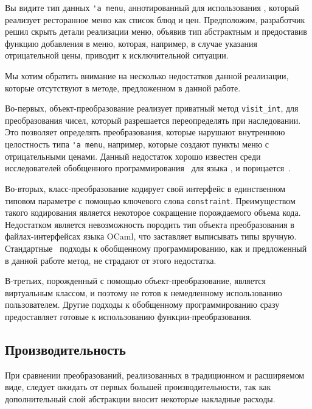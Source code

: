 \noindent Вы видите тип данных \lstinline{'a menu}, аннотированный для использования \visitors{}, который реализует ресторанное меню как список блюд и цен. Предположим, разработчик решил скрыть детали реализации меню, объявив тип абстрактным и предоставив функцию добавления в меню, которая, например, в случае указания отрицательной цены, приводит к исключительной ситуации.

Мы хотим обратить внимание на несколько недостатков данной реализации, которые отсутствуют в методе, предложенном в данной работе.

Во-первых, объект-преобразование реализует приватный метод \lstinline{visit_int}, для преобразования чисел, который разрешается переопределять при наследовании. Это позволяет определять преобразования, которые нарушают внутреннюю целостность типа \lstinline{'a menu}, например, которые создают пункты меню с отрицательными ценами. Данный недостаток хорошо известен среди исследователей обобщенного программирования~\cite{SYB} для языка \haskell{}, и порицается~\cite{SafeHaskell}.

Во-вторых, класс-преобразование кодирует свой интерфейс в единственном типовом параметре с помощью ключевого слова \lstinline{constraint}. Преимуществом такого кодирования является некоторое сокращение порождаемого объема кода. Недостатком является невозможность породить тип объекта преобразования в файлах-интерфейсах языка OCaml{}, что заставляет выписывать типы вручную. Стандартные~\cite{ppxderiving} подходы к обобщенному программированию, как и предложенный в данной работе метод, не страдают от этого недостатка.

В-третьих, порожденный с помощью \visitors{} объект-преобразование, является виртуальным классом, и поэтому не готов к немедленному использованию пользователем. Другие подходы к обобщенному программированию сразу предоставляет готовые к использованию функции-преобразования.




\subsection{Производительность}
\label{sec:performance}

При сравнении преобразований, реализованных в традиционном и расширяемом виде,
следует ожидать от первых большей производительности, так как дополнительный слой абстракции вносит некоторые накладные расходы.

